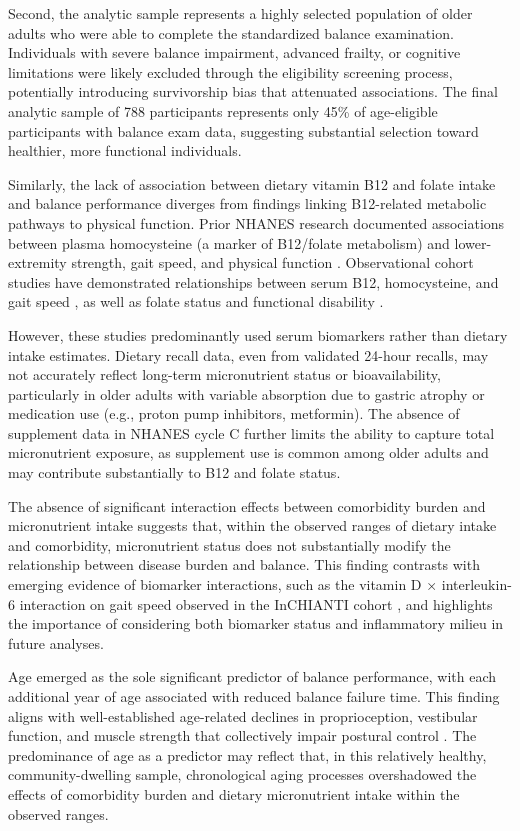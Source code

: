 \documentclass[11pt,a4paper]{article}
\begin{document}
Second, the analytic sample represents a highly selected population of older adults who were able to complete the standardized balance examination. Individuals with severe balance impairment, advanced frailty, or cognitive limitations were likely excluded through the eligibility screening process, potentially introducing survivorship bias that attenuated associations. The final analytic sample of 788 participants represents only 45\% of age-eligible participants with balance exam data, suggesting substantial selection toward healthier, more functional individuals.

Similarly, the lack of association between dietary vitamin B12 and folate intake and balance performance diverges from findings linking B12-related metabolic pathways to physical function. Prior NHANES research documented associations between plasma homocysteine (a marker of B12/folate metabolism) and lower-extremity strength, gait speed, and physical function \cite{kositsawat2022_nhanes_hcy_function}. Observational cohort studies have demonstrated relationships between serum B12, homocysteine, and gait speed \cite{vidoni2017_b12_hcy_gait}, as well as folate status and functional disability \cite{ng2012_b12_folate_function, ji2023_nhanes_folate_disability}.

However, these studies predominantly used serum biomarkers rather than dietary intake estimates. Dietary recall data, even from validated 24-hour recalls, may not accurately reflect long-term micronutrient status or bioavailability, particularly in older adults with variable absorption due to gastric atrophy or medication use (e.g., proton pump inhibitors, metformin). The absence of supplement data in NHANES cycle C further limits the ability to capture total micronutrient exposure, as supplement use is common among older adults and may contribute substantially to B12 and folate status.

The absence of significant interaction effects between comorbidity burden and micronutrient intake suggests that, within the observed ranges of dietary intake and comorbidity, micronutrient status does not substantially modify the relationship between disease burden and balance. This finding contrasts with emerging evidence of biomarker interactions, such as the vitamin D × interleukin-6 interaction on gait speed observed in the InCHIANTI cohort \cite{kositsawat2019_vitd_il6_gait}, and highlights the importance of considering both biomarker status and inflammatory milieu in future analyses.

Age emerged as the sole significant predictor of balance performance, with each additional year of age associated with reduced balance failure time. This finding aligns with well-established age-related declines in proprioception, vestibular function, and muscle strength that collectively impair postural control \cite{talkowski2008_balance_gait_walking}. The predominance of age as a predictor may reflect that, in this relatively healthy, community-dwelling sample, chronological aging processes overshadowed the effects of comorbidity burden and dietary micronutrient intake within the observed ranges.
\end{document}

